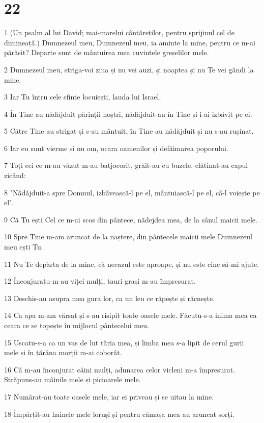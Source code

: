 \chapter{22}

\par 1 (Un psalm al lui David; mai-marelui cântăreților, pentru sprijinul cel de dimineață.) Dumnezeul meu, Dumnezeul meu, ia aminte la mine, pentru ce m-ai părăsit? Departe sunt de mântuirea mea cuvintele greșelilor mele.
\par 2 Dumnezeul meu, striga-voi ziua și nu vei auzi, și noaptea și nu Te vei gândi la mine.
\par 3 Iar Tu întru cele sfinte locuiești, lauda lui Israel.
\par 4 În Tine au nădăjduit părinții noștri, nădăjduit-au în Tine și i-ai izbăvit pe ei.
\par 5 Către Tine au strigat și s-au mântuit, în Tine au nădăjduit și nu s-au rușinat.
\par 6 Iar eu sunt vierme și nu om, ocara oamenilor și defăimarea poporului.
\par 7 Toți cei ce m-au văzut m-au batjocorit, grăit-au cu buzele, clătinat-au capul zicând:
\par 8 "Nădăjduit-a spre Domnul, izbăvească-l pe el, mântuiască-l pe el, că-l voiește pe el".
\par 9 Că Tu ești Cel ce m-ai scos din pântece, nădejdea mea, de la sânul maicii mele.
\par 10 Spre Tine m-am aruncat de la naștere, din pântecele maicii mele Dumnezeul meu ești Tu.
\par 11 Nu Te depărta de la mine, că necazul este aproape, și nu este cine să-mi ajute.
\par 12 Înconjuratu-m-au viței mulți, tauri grași m-au împresurat.
\par 13 Deschis-au asupra mea gura lor, ca un leu ce răpește și răcnește.
\par 14 Ca apa m-am vărsat și s-au risipit toate oasele mele. Făcutu-s-a inima mea ca ceara ce se topește în mijlocul pântecelui meu.
\par 15 Uscatu-s-a ca un vas de lut tăria mea, și limba mea s-a lipit de cerul gurii mele și în țărâna morții m-ai coborât.
\par 16 Că m-au înconjurat câini mulți, adunarea celor vicleni m-a împresurat. Străpuns-au mâinile mele și picioarele mele.
\par 17 Numărat-au toate oasele mele, iar ei priveau și se uitau la mine.
\par 18 Împărțit-au hainele mele loruși și pentru cămașa mea au aruncat sorți.
